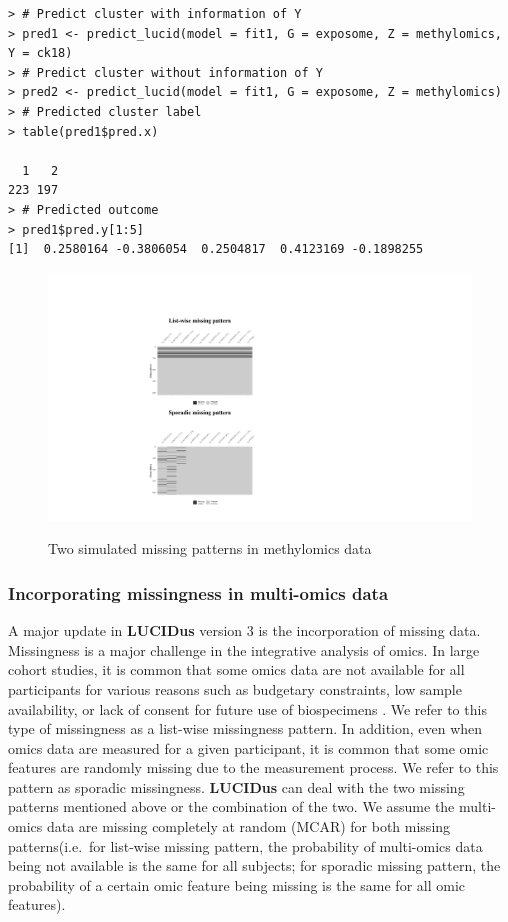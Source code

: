 \begin{verbatim}
> # Predict cluster with information of Y
> pred1 <- predict_lucid(model = fit1, G = exposome, Z = methylomics, Y = ck18)
> # Predict cluster without information of Y
> pred2 <- predict_lucid(model = fit1, G = exposome, Z = methylomics)
> # Predicted cluster label
> table(pred1$pred.x)

  1   2 
223 197 
> # Predicted outcome
> pred1$pred.y[1:5]
[1]  0.2580164 -0.3806054  0.2504817  0.4123169 -0.1898255
\end{verbatim}

\begin{figure}

{\centering \includegraphics[width=1\linewidth,alt={graphic without alt text}]{figures/fig5} 

}

\caption{Two simulated missing patterns in methylomics data}\label{fig:fig5}
\end{figure}

\subsubsection{Incorporating missingness in multi-omics data}\label{incorporating-missingness-in-multi-omics-data}

A major update in \textbf{LUCIDus} version 3 is the incorporation of missing
data. Missingness is a major challenge in the integrative analysis of
omics. In large cohort studies, it is common that some omics data are
not available for all participants for various reasons such as budgetary
constraints, low sample availability, or lack of consent for future use
of biospecimens \citep{voillet2016handling}. We refer to this type of
missingness as a list-wise missingness pattern. In addition, even when
omics data are measured for a given participant, it is common that some
omic features are randomly missing due to the measurement process. We
refer to this pattern as sporadic missingness. \textbf{LUCIDus} can deal with
the two missing patterns mentioned above or the combination of the two.
We assume the multi-omics data are missing completely at random (MCAR)
for both missing patterns(i.e.~for list-wise missing pattern, the
probability of multi-omics data being not available is the same for all
subjects; for sporadic missing pattern, the probability of a certain
omic feature being missing is the same for all omic features).


